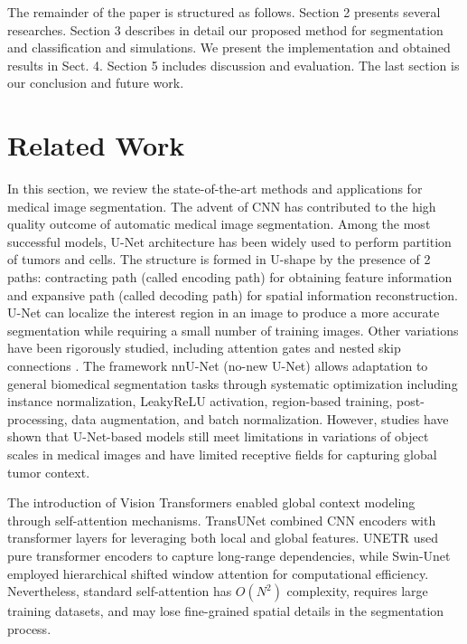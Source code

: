 \documentclass[runningheads]{llncs}
\begin{document}
The remainder of the paper is structured as follows. Section 2 presents several researches. Section 3 describes in detail our proposed method for segmentation and classification and simulations. We present the implementation and obtained results in Sect. 4. Section 5 includes discussion and evaluation. The last section is our conclusion and future work.

%
%
\section{Related Work}

In this section, we review the state-of-the-art methods and applications for medical image segmentation. The advent of CNN has contributed to the high quality outcome of automatic medical image segmentation. Among the most successful models, U-Net architecture \cite{ronneberger2015unet} has been widely used to perform partition of tumors and cells. The structure is formed in U-shape by the presence of 2 paths: contracting path (called encoding path) for obtaining feature information and expansive path (called decoding path) for spatial information reconstruction. U-Net can localize the interest region in an image to produce a more accurate segmentation while requiring a small number of training images. Other variations have been rigorously studied, including attention gates \cite{oktay2018attention} and nested skip connections \cite{zhou2018unet++}. The framework nnU-Net (no-new U-Net) \cite{isensee2021nnu} allows adaptation to general biomedical segmentation tasks through systematic optimization including instance normalization, LeakyReLU activation, region-based training, post-processing, data augmentation, and batch normalization. However, studies have shown that U-Net-based models still meet limitations in variations of object scales in medical images and have limited receptive fields for capturing global tumor context.

The introduction of Vision Transformers \cite{dosovitskiy2020image} enabled global context modeling through self-attention mechanisms. TransUNet \cite{chen2021transunet} combined CNN encoders with transformer layers for leveraging both local and global features. UNETR \cite{hatamizadeh2022unetr} used pure transformer encoders to capture long-range dependencies, while Swin-Unet \cite{cao2022swin} employed hierarchical shifted window attention for computational efficiency. Nevertheless, standard self-attention has $O(N^2)$ complexity, requires large training datasets, and may lose fine-grained spatial details in the segmentation process.
\end{document}

